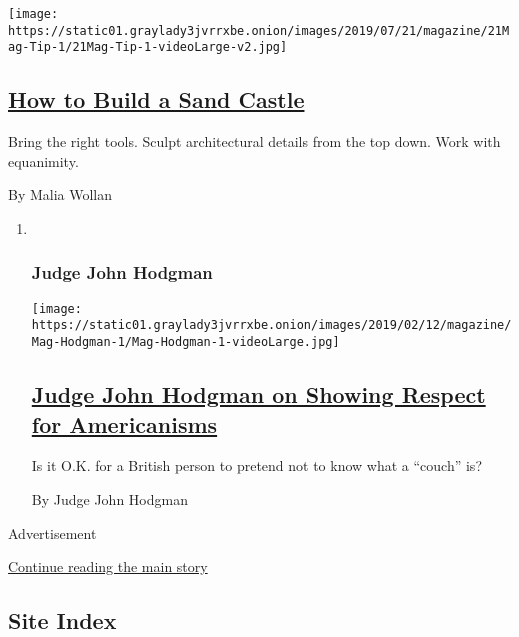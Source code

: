 \begin{enumerate}
  \texttt{[image: https://static01.graylady3jvrrxbe.onion/images/2019/07/21/magazine/21Mag-Tip-1/21Mag-Tip-1-videoLarge-v2.jpg]}

  \hypertarget{how-to-build-a-sand-castle}{%
  \subsection{\texorpdfstring{\href{/2019/07/16/magazine/how-to-build-a-sand-castle-tip.html}{How
  to Build a Sand
  Castle}}{How to Build a Sand Castle}}\label{how-to-build-a-sand-castle}}

  Bring the right tools. Sculpt architectural details from the top down.
  Work with equanimity.

  By Malia Wollan
\end{enumerate}

\begin{enumerate}
\def\labelenumi{\arabic{enumi}.}
\item ~
  \hypertarget{judge-john-hodgman}{%
  \subsubsection{Judge John Hodgman}\label{judge-john-hodgman}}

  \texttt{[image: https://static01.graylady3jvrrxbe.onion/images/2019/02/12/magazine/Mag-Hodgman-1/Mag-Hodgman-1-videoLarge.jpg]}

  \hypertarget{judge-john-hodgman-on-showing-respect-for-americanisms}{%
  \subsection{\texorpdfstring{\href{/2019/07/18/magazine/judge-john-hodgman-on-showing-respect-for-americanisms.html}{Judge
  John Hodgman on Showing Respect for
  Americanisms}}{Judge John Hodgman on Showing Respect for Americanisms}}\label{judge-john-hodgman-on-showing-respect-for-americanisms}}

  Is it O.K. for a British person to pretend not to know what a
  ``couch'' is?

  By Judge John Hodgman
\end{enumerate}

Advertisement

\protect\hyperlink{after-mid1}{Continue reading the main story}

\hypertarget{site-index}{%
\subsection{Site Index}\label{site-index}}

